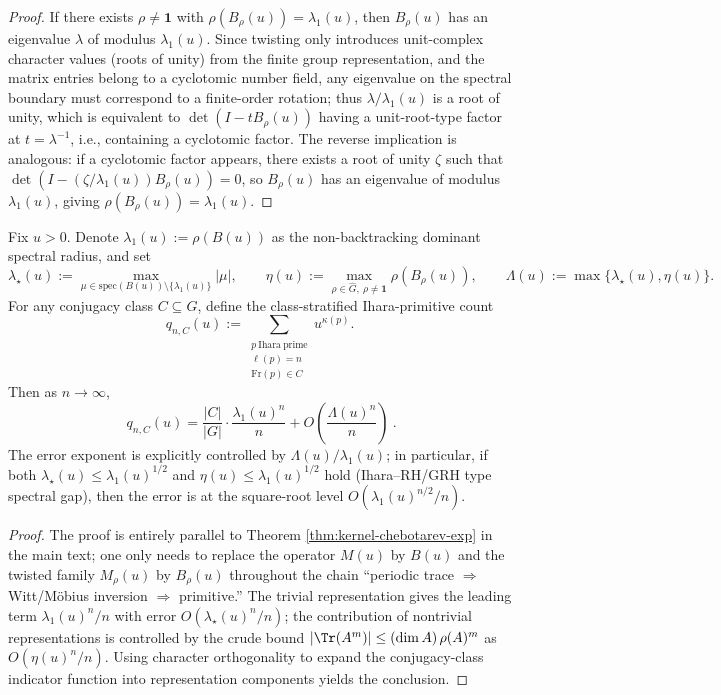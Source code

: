 \begin{proof}
If there exists \(\rho\neq\mathbf 1\) with \(\rho(B_\rho(u))=\lambda_1(u)\), then \(B_\rho(u)\) has an eigenvalue \(\lambda\) of modulus \(\lambda_1(u)\).
Since twisting only introduces unit-complex character values (roots of unity) from the finite group representation, and the matrix entries belong to a cyclotomic number field, any eigenvalue on the spectral boundary must correspond to a finite-order rotation; thus \(\lambda/\lambda_1(u)\) is a root of unity, which is equivalent to \(\det(I-tB_\rho(u))\) having a unit-root-type factor at \(t=\lambda^{-1}\), i.e., containing a cyclotomic factor.
The reverse implication is analogous: if a cyclotomic factor appears, there exists a root of unity \(\zeta\) such that \(\det(I-(\zeta/\lambda_1(u))B_\rho(u))=0\), so \(B_\rho(u)\) has an eigenvalue of modulus \(\lambda_1(u)\), giving \(\rho(B_\rho(u))=\lambda_1(u)\).
\qedhere
\end{proof}

\begin{theorem}\label{thm:ihara-chebotarev-exp}
Fix \(u>0\). Denote \(\lambda_1(u):=\rho(B(u))\) as the non-backtracking dominant spectral radius, and set
\[
\lambda_\star(u):=\max_{\mu\in\mathrm{spec}(B(u))\setminus\{\lambda_1(u)\}}|\mu|,
\qquad
\eta(u):=\max_{\rho\in\widehat G,\ \rho\neq\mathbf 1}\rho(B_\rho(u)),
\qquad
\Lambda(u):=\max\{\lambda_\star(u),\eta(u)\}.
\]
For any conjugacy class \(C\subseteq G\), define the class-stratified Ihara-primitive count
\[
q_{n,C}(u):=\sum_{\substack{p\ \mathrm{Ihara\ prime}\\ \ell(p)=n\\ \mathrm{Fr}(p)\in C}}u^{\kappa(p)}.
\]
Then as \(n\to\infty\),
\[
\boxed{\
q_{n,C}(u)=\frac{|C|}{|G|}\cdot\frac{\lambda_1(u)^n}{n}
+O\!\left(\frac{\Lambda(u)^n}{n}\right)\ }.
\]
The error exponent is explicitly controlled by \(\Lambda(u)/\lambda_1(u)\); in particular, if both
\(
\lambda_\star(u)\le \lambda_1(u)^{1/2}
\)
and
\(
\eta(u)\le \lambda_1(u)^{1/2}
\)
hold (Ihara--RH/GRH type spectral gap), then the error is at the square-root level
\(
O(\lambda_1(u)^{n/2}/n)
\).
\end{theorem}

\begin{proof}
The proof is entirely parallel to Theorem \ref{thm:kernel-chebotarev-exp} in the main text; one only needs to replace the operator \(M(u)\) by \(B(u)\) and the twisted family \(M_\rho(u)\) by \(B_\rho(u)\) throughout the chain ``periodic trace \(\Rightarrow\) Witt/M\"obius inversion \(\Rightarrow\) primitive.''
The trivial representation gives the leading term \(\lambda_1(u)^n/n\) with error \(O(\lambda_\star(u)^n/n)\); the contribution of nontrivial representations is controlled by the crude bound
\(
|\Tr(A^m)|\le (\dim A)\,\rho(A)^m
\)
as \(O(\eta(u)^n/n)\). Using character orthogonality to expand the conjugacy-class indicator function into representation components yields the conclusion.
\qedhere
\end{proof}

